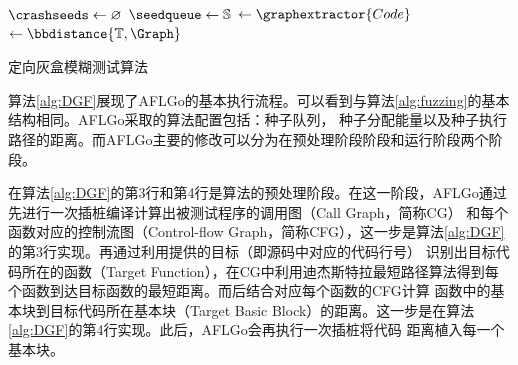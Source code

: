 \documentclass[bachelor]{njupthesis}
\begin{document}
\begin{algorithm}[H]
	\DontPrintSemicolon
	$\crashseeds\gets \varnothing$\; 
	$\seedqueue \gets \seeds$\;
	\Graph $\gets \graphextractor{\sourcecode}$\;
	\BBdis $\gets \bbdistance{\targets,\Graph}$\;
	\Return{\crashseeds}\;
	\caption[short]{定向灰盒模糊测试算法}\label{alg:DGF} 
\end{algorithm} 
\vspace{6pt}

算法\ref{alg:DGF}展现了AFLGo的基本执行流程。可以看到与算法\ref{alg:fuzzing}的基本结构相同。AFLGo采取的算法配置包括：种子队列，
种子分配能量以及种子执行路径的距离。而AFLGo主要的修改可以分为在预处理阶段阶段和运行阶段两个阶段。

在算法\ref{alg:DGF}的第3行和第4行是算法的预处理阶段。在这一阶段，AFLGo通过先进行一次插桩编译计算出被测试程序的调用图（Call Graph，简称CG）
和每个函数对应的控制流图（Control-flow Graph，简称CFG），这一步是算法\ref{alg:DGF}的第3行实现。再通过利用提供的目标（即源码中对应的代码行号）
识别出目标代码所在的函数（Target Function），在CG中利用迪杰斯特拉最短路径算法得到每个函数到达目标函数的最短距离。而后结合对应每个函数的CFG计算
函数中的基本块到目标代码所在基本块（Target Basic Block）的距离。这一步是在算法\ref{alg:DGF}的第4行实现。此后，AFLGo会再执行一次插桩将代码
距离植入每一个基本块。
\end{document}
